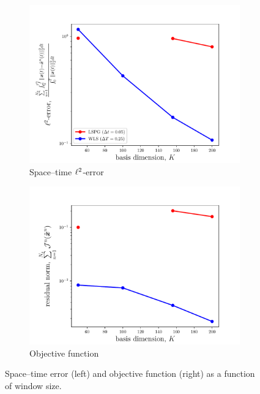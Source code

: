 \begin{figure}
\begin{center}
\begin{subfigure}[t]{0.45\textwidth}
\includegraphics[trim={0cm 0cm 0cm 0cm},clip,width=1.\linewidth]{figs/cavity_new/error_vs_basisSize.pdf}
\caption{Space--time $\ell^2$-error}
\label{fig:cav_results_basisdima}
\end{subfigure}
\begin{subfigure}[t]{0.45\textwidth}
\includegraphics[trim={0cm 0cm 0cm 0cm},clip,width=1.\linewidth]{figs/cavity_new/residual_vs_basisSize.pdf}
\caption{Objective function} 
\label{fig:cav_results_basisdimb}
\end{subfigure}
\end{center}
\caption{Space--time error (left) and objective function (right) as a function of window size.}
\label{fig:cav_results_basisdim}
\end{figure}


